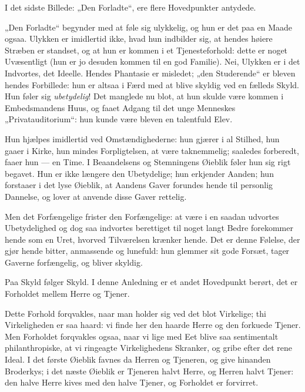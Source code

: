\documentclass[12pt,a4paper]{book}
\newcommand{\apage}[1]{\marginnote{\footnotesize\textit{[#1]}}}
\begin{document}
I det sidste Billede: „Den Forladte“, ere flere Hovedpunkter antydede.

„Den Forladte“ begynder med at føle sig ulykkelig, og hun er det paa en
Maade ogsaa. Ulykken er imidlertid ikke, hvad hun indbilder sig, at
hendes høiere Stræben er standset, og at hun er kommen i et
Tjenesteforhold: dette er noget Uvæsentligt (hun er jo desuden kommen til
en god Familie). Nei, Ulykken er i det Indvortes, det Ideelle. Hendes
Phantasie er misledet; „den Studerende“ er bleven hendes Forbillede: hun
er altsaa i Færd med at blive skyldig ved en fælleds Skyld. Hun føler sig
\emph{ubetydelig}! Det manglede nu blot, at hun skulde være kommen i
Embedsmandens Huus, og faaet Adgang til det unge Menneskes
„Privatauditorium“: hun kunde være bleven en talentfuld Elev.

Hun hjælpes imidlertid ved Omstændighederne: hun gjærer i al Stilhed, hun
gaaer i Kirke, hun mindes Forpligtelsen, at være taknemmelig; saaledes
forberedt, faaer hun --- en Time. I Beaandelsens og Stemningens Øieblik
føler hun sig rigt begavet. Hun er ikke længere den Ubetydelige; hun
erkjender Aanden; hun forstaaer i det lyse Øieblik, at Aandens Gaver
forundes hende til personlig Dannelse, og lover at anvende disse Gaver
rettelig.

Men det Forfængelige frister den Forfængelige: at være i en saadan
udvortes Ubetydelighed og dog saa indvortes \apage{103}
berettiget til noget langt Bedre forekommer hende som en Uret, hvorved
Tilværelsen krænker hende. Det er denne Følelse, der gjør hende bitter,
anmassende og lunefuld: hun glemmer sit gode Forsæt, tager Gaverne
forfængelig, og bliver skyldig.

Paa Skyld følger Skyld. I denne Anledning er et andet Hovedpunkt berørt,
det er Forholdet mellem Herre og Tjener.

Dette Forhold forqvakles, naar man holder sig ved det blot Virkelige;
thi Virkeligheden er saa haard: vi finde her den haarde Herre og den
forkuede Tjener. Men Forholdet forqvakles ogsaa, naar vi lige med Eet
blive saa sentimentalt philanthropiske, at vi ringeagte Virkelighedens
Skranker, og gribe efter det rene Ideal. I det første Øieblik favnes da
Herren og Tjeneren, og give hinanden Broderkys; i det næste Øieblik er
Tjeneren halvt Herre, og Herren halvt Tjener: den halve Herre kives med
den halve Tjener, og Forholdet er forvirret.
\end{document}
